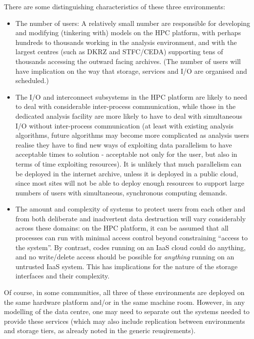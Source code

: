There are some distinguishing characteristics of these three environments:
\begin{itemize}
\item The number of users: A relatively small number are responsible for
developing and modifying (tinkering with) models on the HPC platform, with perhaps
hundreds to thousands working in the analysis environment, and with the largest
centres (such as DKRZ and STFC/CEDA) supporting tens of thousands accessing the
outward facing archives. (The number of users will have implication on the
way that storage, services and I/O are organised and scheduled.)
\item The I/O and interconnect subsystems in the HPC platform are likely to need to deal with considerable inter-process communication, while those in the dedicated
analysis facility are more likely to have to deal with simultaneous I/O without
inter-process communication (at least with existing analysis algorithms, future
algorithms may become more complicated as analysis users realise they have
to find new ways of exploiting data parallelism to have acceptable times to
solution - acceptable not only for the user, but also in terms of time
exploiting resources). It is unlikely that much parallelism can be deployed
in the internet archive, unless it is deployed in a public cloud, since most
sites will not be able to deploy enough resources to support large numbers of
users with simultaneous, synchronous computing demands.
\item The amount and complexity of systems to protect users from each other
and from both deliberate and inadvertent data destruction will vary considerably across these domains: on the HPC platform, it can be assumed that all processes
can run with minimal access control beyond constraining ``access to the system''.
By contrast, codes running on an IaaS cloud could do anything, and no write/delete
access should be possible for \textit{anything} running on an untrusted IaaS system. This has implications for the nature of the storage interfaces and their complexity.
\end{itemize}

Of course, in some communities, all three of these environments are deployed
on the same hardware platform and/or in the same machine room. However,
in any modelling of the data centre, one may need to separate out the
systems needed to provide these services (which may also include
replication between environments and storage tiers, as already noted
in the generic reuqirements).

